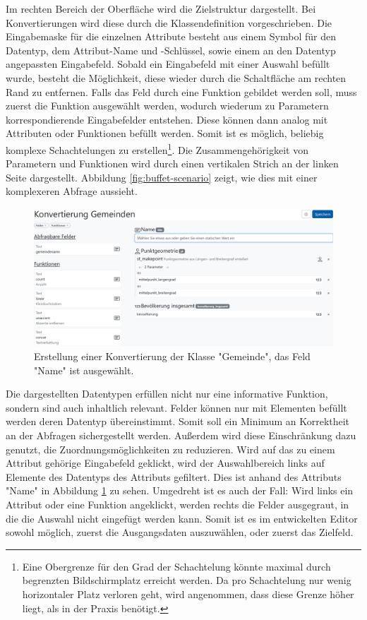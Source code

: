 Im rechten Bereich der Oberfläche wird die Zielstruktur dargestellt. Bei Konvertierungen wird diese durch die Klassendefinition vorgeschrieben. Die Eingabemaske für die einzelnen Attribute besteht aus einem Symbol für den Datentyp, dem Attribut-Name und -Schlüssel, sowie einem an den Datentyp angepassten Eingabefeld. Sobald ein Eingabefeld mit einer Auswahl befüllt wurde, besteht die Möglichkeit, diese wieder durch die Schaltfläche am rechten Rand zu entfernen. Falls das Feld durch eine Funktion gebildet werden soll, muss zuerst die Funktion ausgewählt werden, wodurch wiederum zu Parametern korrespondierende Eingabefelder entstehen. Diese können dann analog mit Attributen oder Funktionen befüllt werden. Somit ist es möglich, beliebig komplexe Schachtelungen zu erstellen\footnote{Eine Obergrenze für den Grad der Schachtelung könnte maximal durch begrenzten Bildschirmplatz erreicht werden. Da pro Schachtelung nur wenig horizontaler Platz verloren geht, wird angenommen, dass diese Grenze höher liegt, als in der Praxis benötigt.}. Die Zusammengehörigkeit von Parametern und Funktionen wird durch einen vertikalen Strich an der linken Seite dargestellt. Abbildung \ref{fig:buffet-scenario} zeigt, wie dies mit einer komplexeren Abfrage aussieht.

\begin{figure}[ht]
  \begin{center}
    \includegraphics[width=.95\textwidth]{assets/buffet-selected.png}
  \end{center}
  \caption{Erstellung einer Konvertierung der Klasse "Gemeinde", das Feld "Name" ist ausgewählt.}
  \label{fig:buffet-selected}
\end{figure}

Die dargestellten Datentypen erfüllen nicht nur eine informative Funktion, sondern sind auch inhaltlich relevant. Felder können nur mit Elementen befüllt werden deren Datentyp übereinstimmt. Somit soll ein Minimum an Korrektheit an der Abfragen sichergestellt werden. Außerdem wird diese Einschränkung dazu genutzt, die Zuordnungsmöglichkeiten zu reduzieren. Wird auf das zu einem Attribut gehörige Eingabefeld geklickt, wird der Auswahlbereich links auf Elemente des Datentyps des Attributs gefiltert. Dies ist anhand des Attributs "Name" in Abbildung \ref{fig:buffet-selected} zu sehen. Umgedreht ist es auch der Fall: Wird links ein Attribut oder eine Funktion angeklickt, werden rechts die Felder ausgegraut, in die die Auswahl nicht eingefügt werden kann. Somit ist es im entwickelten Editor sowohl möglich, zuerst die Ausgangsdaten auszuwählen, oder zuerst das Zielfeld.


